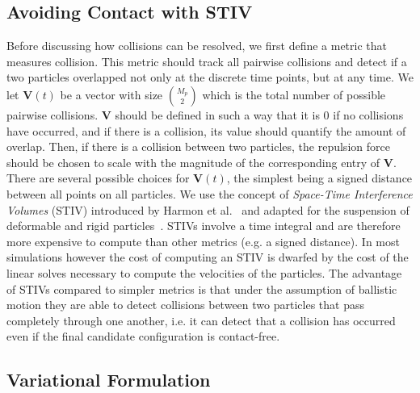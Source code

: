 \documentclass[preprint, 10pt]{elsarticle}
\begin{document}
\subsection{Avoiding Contact with STIV}
Before discussing how collisions can be resolved, we first define a
metric that measures collision.  This metric should track all pairwise
collisions and detect if a two particles overlapped not only at the
discrete time points, but at any time.  We let $\mathbf{V}(t)$ be a
vector with size $\binom{M_p}{2}$ which is the total number of possible
pairwise collisions.  $\mathbf{V}$ should be defined in such a way that
it is 0 if no collisions have occurred, and if there is a collision, its
value should quantify the amount of overlap.   Then, if there is a
collision between two particles, the repulsion force should be chosen to
scale with the magnitude of the corresponding entry of $\mathbf{V}$.
There are several possible choices for $\mathbf{V}(t)$, the simplest
being a signed distance between all points on all particles. We use the
concept of {\em Space-Time Interference Volumes} (STIV) introduced by
Harmon et al.~\cite{Harmon2011} and adapted for the suspension of
deformable and rigid particles~\cite{Lu2017}. STIVs involve a time integral and
are therefore more expensive to compute than other metrics (e.g. a signed
distance). In most simulations however the cost of computing an STIV is dwarfed by the cost of the linear solves necessary to compute the velocities of the particles. The advantage of STIVs compared to simpler metrics is that under the assumption of
ballistic motion they are able to detect collisions between two particles that
pass completely through one another, i.e. it can detect that a collision has occurred even if the final candidate configuration is contact-free.





\subsection{Variational Formulation}
\end{document}
